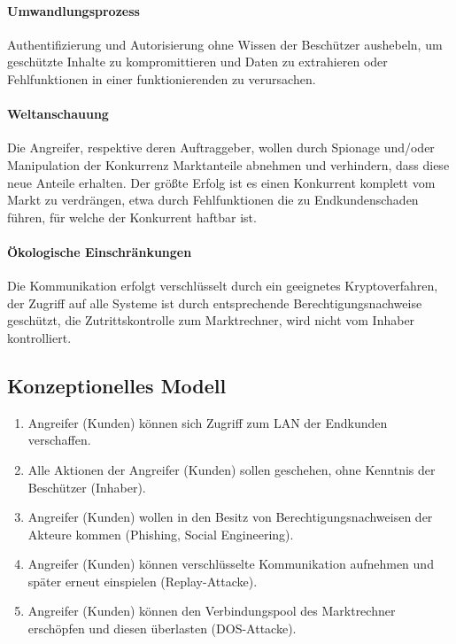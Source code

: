 \documentclass[11pt,a4paper]{report}
\begin{document}
\paragraph{Umwandlungsprozess} Authentifizierung und Autorisierung ohne Wissen der Beschützer aushebeln, um geschützte Inhalte zu kompromittieren und Daten zu extrahieren oder Fehlfunktionen in einer funktionierenden zu verursachen.

\paragraph{Weltanschauung} Die Angreifer, respektive deren Auftraggeber, wollen durch Spionage und/oder Manipulation der Konkurrenz Marktanteile abnehmen und verhindern, dass diese neue Anteile erhalten. Der größte Erfolg ist es einen Konkurrent komplett vom Markt zu verdrängen, etwa durch Fehlfunktionen die zu Endkundenschaden führen, für welche der Konkurrent haftbar ist. 

\paragraph{Ökologische Einschränkungen} Die Kommunikation erfolgt verschlüsselt durch ein geeignetes Kryptoverfahren, der Zugriff auf alle Systeme ist durch entsprechende Berechtigungsnachweise geschützt, die Zutrittskontrolle zum Marktrechner, wird nicht vom Inhaber kontrolliert.

\subsection{Konzeptionelles Modell}

\begin{enumerate}[leftmargin=*]
\item Angreifer (Kunden) können sich Zugriff zum LAN der Endkunden verschaffen.
\item Alle Aktionen der Angreifer (Kunden) sollen geschehen, ohne Kenntnis der Beschützer (Inhaber).
\item Angreifer (Kunden) wollen in den Besitz von Berechtigungsnachweisen der Akteure kommen (Phishing, Social Engineering).
\item Angreifer (Kunden) können verschlüsselte Kommunikation aufnehmen und später erneut einspielen (Replay-Attacke).
\item Angreifer (Kunden) können den Verbindungspool des Marktrechner erschöpfen und diesen überlasten (DOS-Attacke).
\end{enumerate}
\end{document}
